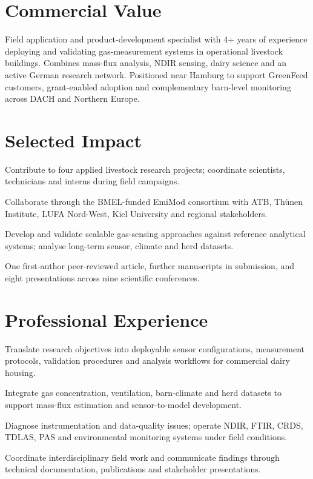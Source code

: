 \documentclass[10pt,a4paper]{article}
\begin{document}
\fontsize{9.1}{10.6}\selectfont
\brandheader


\section*{Commercial Value}
Field application and product-development specialist with 4+ years of experience deploying and validating gas-measurement systems in operational livestock buildings. Combines mass-flux analysis, NDIR sensing, dairy science and an active German research network. Positioned near Hamburg to support GreenFeed customers, grant-enabled adoption and complementary barn-level monitoring across DACH and Northern Europe.

\section*{Selected Impact}
\begin{compactitems}
  \item Contribute to four applied livestock research projects; coordinate scientists, technicians and interns during field campaigns.
  \item Collaborate through the BMEL-funded EmiMod consortium with ATB, Thünen Institute, LUFA Nord-West, Kiel University and regional stakeholders.
  \item Develop and validate scalable gas-sensing approaches against reference analytical systems; analyse long-term sensor, climate and herd datasets.
  \item One first-author peer-reviewed article, further manuscripts in submission, and eight presentations across nine scientific conferences.
\end{compactitems}

\section*{Professional Experience}
\begin{compactitems}
  \item Translate research objectives into deployable sensor configurations, measurement protocols, validation procedures and analysis workflows for commercial dairy housing.
  \item Integrate gas concentration, ventilation, barn-climate and herd datasets to support mass-flux estimation and sensor-to-model development.
  \item Diagnose instrumentation and data-quality issues; operate NDIR, FTIR, CRDS, TDLAS, PAS and environmental monitoring systems under field conditions.
  \item Coordinate interdisciplinary field work and communicate findings through technical documentation, publications and stakeholder presentations.
\end{compactitems}
\end{document}
